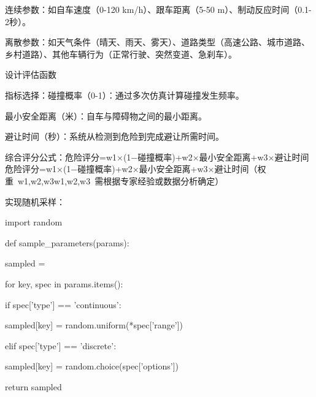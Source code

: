 连续参数：如自车速度（0-120 km/h）、跟车距离（5-50 m）、制动反应时间（0.1-2秒）。

离散参数：如天气条件（晴天、雨天、雾天）、道路类型（高速公路、城市道路、乡村道路）、其他车辆行为（正常行驶、突然变道、急刹车）。

设计评估函数


指标选择：碰撞概率（0-1）：通过多次仿真计算碰撞发生频率。

最小安全距离（米）：自车与障碍物之间的最小距离。

避让时间（秒）：系统从检测到危险到完成避让所需时间。

综合评分公式：危险评分=w1×(1−碰撞概率)+w2×最小安全距离+w3×避让时间危险评分=w1​×(1−碰撞概率)+w2​×最小安全距离+w3​×避让时间（权重 w1,w2,w3w1​,w2​,w3​ 需根据专家经验或数据分析确定）

实现随机采样：

import random

def sample\_parameters(params):

sampled = {}

for key, spec in params.items():

if spec['type'] == 'continuous':

sampled[key] = random.uniform(*spec['range'])

elif spec['type'] == 'discrete':

sampled[key] = random.choice(spec['options'])

return sampled

\newpage